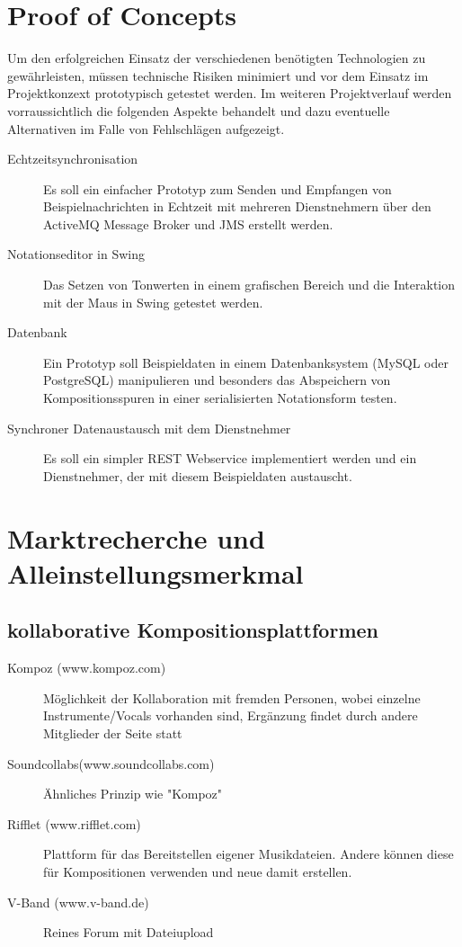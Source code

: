 \documentclass[12pt]{scrartcl}
\begin{document}

\section{Proof of Concepts}
Um den erfolgreichen Einsatz der verschiedenen benötigten Technologien zu gewährleisten, müssen technische Risiken minimiert und vor dem Einsatz im Projektkonzext prototypisch getestet werden. Im weiteren Projektverlauf werden vorraussichtlich die folgenden Aspekte behandelt und dazu eventuelle Alternativen im Falle von Fehlschlägen aufgezeigt.

\begin{description}
\item[Echtzeitsynchronisation]
Es soll ein einfacher Prototyp zum Senden und Empfangen von Beispielnachrichten in Echtzeit mit mehreren Dienstnehmern über den ActiveMQ Message Broker und JMS erstellt werden.
\item[Notationseditor in Swing]
Das Setzen von Tonwerten in einem grafischen Bereich und die Interaktion mit der Maus in Swing getestet werden.
\item[Datenbank]
Ein Prototyp soll Beispieldaten in einem Datenbanksystem (MySQL oder PostgreSQL) manipulieren und besonders das Abspeichern von Kompositionsspuren in einer serialisierten Notationsform testen.
\item[Synchroner Datenaustausch mit dem Dienstnehmer]
Es soll ein simpler REST Webservice implementiert werden und ein Dienstnehmer, der mit diesem Beispieldaten austauscht.
\end{description}




\section{Marktrecherche und Alleinstellungsmerkmal}

\subsection{kollaborative Kompositionsplattformen}
\parskip 12pt
\begin{description}
\item[Kompoz (www.kompoz.com)]
Möglichkeit der Kollaboration mit fremden Personen, wobei
einzelne Instrumente/Vocals vorhanden sind,
Ergänzung findet durch andere Mitglieder der Seite statt

\item[Soundcollabs(www.soundcollabs.com)]
Ähnliches Prinzip wie "Kompoz"

\item[Rifflet (www.rifflet.com)]
Plattform für das Bereitstellen eigener Musikdateien. Andere können diese für Kompositionen verwenden und neue damit erstellen.

\item[V-Band (www.v-band.de)]
Reines Forum mit Dateiupload

\end{description}
\end{document}
